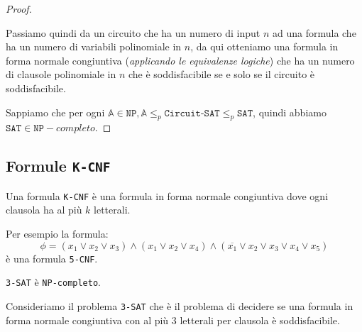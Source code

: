 \begin{proof}
\begin{enumerate}
            Passiamo quindi da un circuito che ha un numero di input $n$ ad una 
            formula che ha un numero di variabili polinomiale in $n$, da qui 
            otteniamo una formula in forma normale congiuntiva (\textit{applicando 
            le equivalenze logiche}) che ha un numero di clausole polinomiale in $n$ 
            che è soddisfacibile se e solo se il circuito è soddisfacibile.
    \end{enumerate}
    Sappiamo che per ogni $\mathbb{A} \in \texttt{NP}, \mathbb{A}
    \leq_p \texttt{Circuit-SAT} \leq_p \texttt{SAT}$, quindi abbiamo 
    $\texttt{SAT} \in \texttt{NP}-completo$.
\end{proof}
\subsection{Formule \texttt{K-CNF}}
Una formula \texttt{K-CNF} è una formula in forma normale congiuntiva 
dove ogni clausola ha al più $k$ letterali.

Per esempio la formula:
\[
    \phi = (x_1 \lor x_2 \lor x_3) \land (x_1 \lor x_2 \lor x_4) \land
    (\overline{x_1} \lor x_2 \lor x_3 \lor x_4 \lor x_5)
\]
è una formula \texttt{5-CNF}.

\begin{theorem}
    \texttt{3-SAT} è \texttt{NP-completo}.
\end{theorem}

Consideriamo il problema \texttt{3-SAT} che è il problema di decidere
se una formula in forma normale congiuntiva con al più 3 letterali per
clausola è soddisfacibile.

